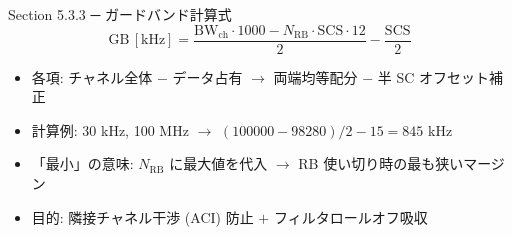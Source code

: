 \begin{frame}{Section 5.3.3 ─ ガードバンド計算式}
\begin{equation*}
\mathrm{GB}\,[\mathrm{kHz}] = \frac{\mathrm{BW}_{\mathrm{ch}} \cdot 1000 - N_{\mathrm{RB}} \cdot \mathrm{SCS} \cdot 12}{2} - \frac{\mathrm{SCS}}{2}
\end{equation*}

\begin{itemize}
  \item 各項: チャネル全体 $-$ データ占有 $\to$ 両端均等配分 $-$ 半 SC オフセット補正
  \item 計算例: 30 kHz, 100 MHz $\to$ $(100000 - 98280)/2 - 15 = 845$ kHz
  \item 「最小」の意味: $N_{\mathrm{RB}}$ に最大値を代入 $\to$ RB 使い切り時の最も狭いマージン
  \item 目的: 隣接チャネル干渉 (ACI) 防止 $+$ フィルタロールオフ吸収
\end{itemize}
\end{frame}

